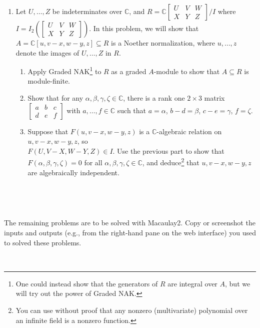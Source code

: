 \documentclass[12pt]{amsart}
\newcommand{\C}{\mathbb{C}}
\begin{document}
\begin{enumerate}
\item Let $U,\dots,Z$ be indeterminates over $\C$, and $\displaystyle R= \C \begin{bmatrix} U & V & W \\ X & Y & Z \end{bmatrix} \Big/ I$ where $I=I_2\left(\begin{bmatrix} U & V & W \\ X & Y & Z \end{bmatrix}\right)$. In this problem, we will show that $A=\C[u, v-x, w-y, z] \subseteq R$ is a Noether normalization, where $u,\dots,z$ denote the images of $U,\dots,Z$ in $R$.
\begin{enumerate}
\item Apply Graded NAK\footnote{One could instead show that the generators of $R$ are integral over $A$, but we will try out the power of Graded NAK.} to $R$ as a graded $A$-module to show that $A\subseteq R$ is module-finite.
\item Show that for any $\alpha,\beta,\gamma,\zeta \in \C$, there is a rank one $2\times 3$ matrix $\begin{bmatrix}  a & b & c \\ d & e & f\end{bmatrix}$ with $a,\dots,f\in \C$ such that $a =\alpha$, $b-d = \beta$, $c-e= \gamma$, $f=\zeta$.
\item Suppose that $F(u,v-x,w-y,z)$ is a $\C$-algebraic relation on $u,v-x,w-y,z$, so \\ ${F(U,V-X,W-Y,Z)\in I}$. Use the previous part to show that $F(\alpha,\beta,\gamma,\zeta)=0$ for all $\alpha,\beta,\gamma,\zeta \in \C$, and deduce\footnote{You can use without proof that any nonzero (multivariate) polynomial over an infinite field is a nonzero function.} that $u,v-x,w-y,z$ are algebraically independent.
\end{enumerate}


\

\end{enumerate}


\


The remaining problems are to be solved with Macaulay2. Copy or screenshot the inputs and outputs (e.g., from the right-hand pane on the web interface) you used to solved these problems.

\
\end{document}
